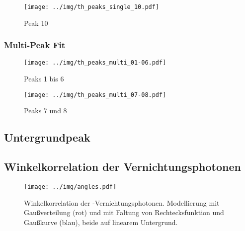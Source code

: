 \begin{figure}[H]
\begin{center}
  \texttt{[image: ../img/th\_peaks\_single\_10.pdf]}
  \caption{Peak 10}
  \label{img:th:peaks:single:10}
\end{center}
\end{figure}

\subsubsection{Multi-Peak Fit} %
\begin{figure}[H]
\begin{center}
  \texttt{[image: ../img/th\_peaks\_multi\_01-06.pdf]}
  \caption{Peaks 1 bis 6}
  \label{img:th:peaks:multi:0106}
\end{center}
\end{figure}

\begin{figure}[H]
\begin{center}
  \texttt{[image: ../img/th\_peaks\_multi\_07-08.pdf]}
  \caption{Peaks 7 und 8}
  \label{img:th:peaks:multi:0708}
\end{center}
\end{figure}

\subsection{Untergrundpeak}
\label{sub:eval:undergroundpeak}

\subsection{Winkelkorrelation der  Vernichtungsphotonen}
\begin{figure}[H]
\begin{center}
  \texttt{[image: ../img/angles.pdf]}
  \caption{Winkelkorrelation der \na-Vernichtungsphotonen.
  Modellierung mit Gaußverteilung (rot) und
  mit Faltung von Rechtecksfunktion und Gaußkurve (blau), beide auf linearem Untergrund.}
  \label{img:angles}
\end{center}
\end{figure}

